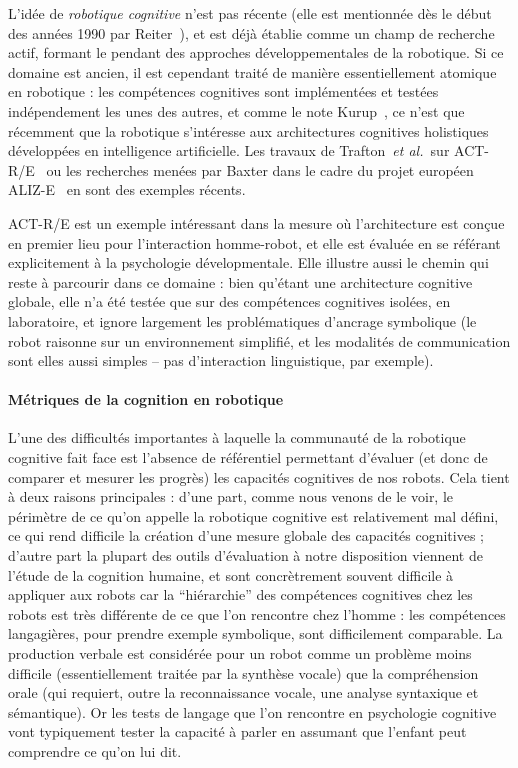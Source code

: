 \documentclass[a4paper]{article}
\newcommand{\etal}{{\textit{et al.~}}}
\begin{document}
L'idée de \emph{robotique cognitive} n'est pas récente (elle est mentionnée dès
le début des années 1990 par Reiter~\cite{Levesque2008}), et est déjà établie
comme un champ de recherche actif, formant le pendant des approches
développementales de la robotique. Si ce domaine est ancien, il est cependant
traité de manière essentiellement atomique en robotique : les compétences
cognitives sont implémentées et testées indépendement les unes des autres, et
comme le note Kurup~\cite{kurup2012what}, ce n'est que récemment que la
robotique s'intéresse aux architectures cognitives holistiques développées en
intelligence artificielle. Les travaux de Trafton~\etal sur
ACT-R/E~\cite{trafton2013act} ou les recherches menées par Baxter dans le cadre
du projet européen ALIZ-E~\cite{baxter2013cognitive} en sont des exemples
récents.

ACT-R/E est un exemple intéressant dans la mesure où l'architecture est conçue
en premier lieu pour l'interaction homme-robot, et elle est évaluée en se
référant explicitement à la psychologie dévelopmentale. Elle illustre aussi le
chemin qui reste à parcourir dans ce domaine : bien qu'étant une architecture
cognitive globale, elle n'a été testée que sur des compétences cognitives
isolées, en laboratoire, et ignore largement les problématiques d'ancrage
symbolique (le robot raisonne sur un environnement simplifié, et les modalités
de communication sont elles aussi simples -- pas d'interaction linguistique, par
exemple).


\paragraph{Métriques de la cognition en robotique}

L'une des difficultés importantes à laquelle la communauté de la robotique
cognitive fait face est l'absence de référentiel permettant d'évaluer (et donc
de comparer et mesurer les progrès) les capacités cognitives de nos robots.
Cela tient à deux raisons principales : d'une part, comme nous venons de le
voir, le périmètre de ce qu'on appelle la robotique cognitive est relativement
mal défini, ce qui rend difficile la création d'une mesure globale des capacités
cognitives ; d'autre part la plupart des outils d'évaluation à notre disposition
viennent de l'étude de la cognition humaine, et sont concrètrement souvent
difficile à appliquer aux robots car la ``hiérarchie'' des compétences
cognitives chez les robots est très différente de ce que l'on rencontre chez
l'homme : les compétences langagières, pour prendre exemple symbolique, sont
difficilement comparable. La production verbale est considérée pour un robot
comme un problème moins difficile (essentiellement traitée par la synthèse
vocale) que la compréhension orale (qui requiert, outre la reconnaissance
vocale, une analyse syntaxique et sémantique). Or les tests de langage que l'on
rencontre en psychologie cognitive vont typiquement tester la capacité à parler
en assumant que l'enfant peut comprendre ce qu'on lui dit.
\end{document}
